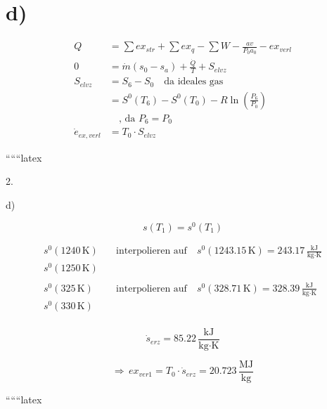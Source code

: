 

\section*{d)}
\begin{align*}
Q &= \sum ex_{str} + \sum ex_q - \sum W - \frac{av}{P_0 a_0} - ex_{verl} \\
0 &= \dot{m}(s_0 - s_a) + \frac{\dot{Q}}{T} + S_{elvz} \\
S_{elvz} &= S_6 - S_0 \quad \text{da ideales gas} \\
&= S^0(T_6) - S^0(T_0) - R \ln \left( \frac{P_6}{P_0} \right) \\
&\quad \text{, da } P_6 = P_0 \\
\dot{e}_{ex,verl} &= T_0 \cdot S_{elvz}
\end{align*}

``````latex

2.

d)

\[
s(T_1) = s^0(T_1)
\]

\[
\begin{aligned}
s^0(1240 \, \text{K}) & \quad \text{interpolieren auf} \quad s^0(1243.15 \, \text{K}) = 243.17 \, \frac{\text{kJ}}{\text{kg} \cdot \text{K}} \\
s^0(1250 \, \text{K}) & \\
\\
s^0(325 \, \text{K}) & \quad \text{interpolieren auf} \quad s^0(328.71 \, \text{K}) = 328.39 \, \frac{\text{kJ}}{\text{kg} \cdot \text{K}} \\
s^0(330 \, \text{K}) & \\
\end{aligned}
\]

\[
\dot{s}_{erz} = 85.22 \, \frac{\text{kJ}}{\text{kg} \cdot \text{K}}
\]

\[
\Rightarrow \, ex_{ver1} = T_0 \cdot \dot{s}_{erz} = 20.723 \, \frac{\text{MJ}}{\text{kg}}
\]

``````latex